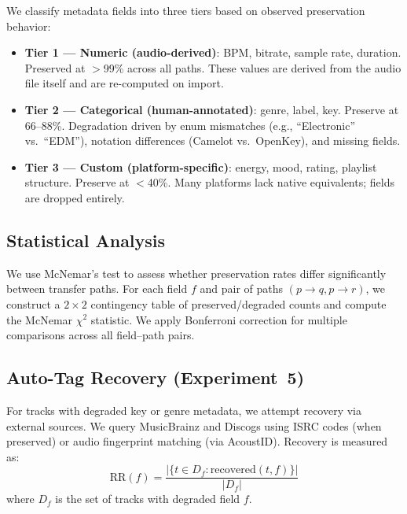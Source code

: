 We classify metadata fields into three tiers based on observed preservation behavior:
\begin{itemize}
  \item \textbf{Tier 1 --- Numeric (audio-derived)}: BPM, bitrate, sample rate, duration. Preserved at $>$99\% across all paths. These values are derived from the audio file itself and are re-computed on import.
  \item \textbf{Tier 2 --- Categorical (human-annotated)}: genre, label, key. Preserve at 66--88\%. Degradation driven by enum mismatches (e.g., ``Electronic'' vs.\ ``EDM''), notation differences (Camelot vs.\ OpenKey), and missing fields.
  \item \textbf{Tier 3 --- Custom (platform-specific)}: energy, mood, rating, playlist structure. Preserve at $<$40\%. Many platforms lack native equivalents; fields are dropped entirely.
\end{itemize}

\subsection{Statistical Analysis}

We use McNemar's test to assess whether preservation rates differ significantly between transfer paths. For each field $f$ and pair of paths $(p \to q, p \to r)$, we construct a $2 \times 2$ contingency table of preserved/degraded counts and compute the McNemar $\chi^2$ statistic. We apply Bonferroni correction for multiple comparisons across all field--path pairs.

\subsection{Auto-Tag Recovery (Experiment~5)}

For tracks with degraded key or genre metadata, we attempt recovery via external sources. We query MusicBrainz and Discogs using ISRC codes (when preserved) or audio fingerprint matching (via AcoustID). Recovery is measured as:
\begin{equation}
  \text{RR}(f) = \frac{| \{ t \in D_f : \text{recovered}(t, f) \} |}{|D_f|}
\end{equation}
where $D_f$ is the set of tracks with degraded field $f$.
